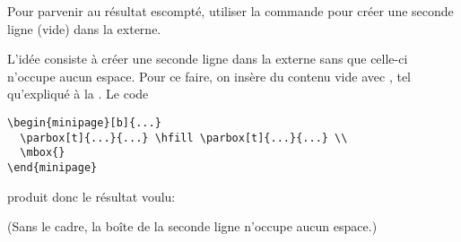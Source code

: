 \begin{exercice}
  Pour parvenir au résultat escompté, utiliser la commande \cmd{\mbox}
  pour créer une seconde ligne (vide) dans la  externe.
  \begin{sol}
    L'idée consiste à créer une seconde ligne dans la 
    externe sans que celle-ci n'occupe aucun espace. Pour ce faire, on
    insère du contenu vide avec , tel qu'expliqué à la
    . Le code
\begin{lstlisting}
\begin{minipage}[b]{...}
  \parbox[t]{...}{...} \hfill \parbox[t]{...}{...} \\
  \mbox{}
\end{minipage}
\end{lstlisting}
    produit donc le résultat voulu:
    \begin{center}
      \begin{minipage}{0.8\linewidth}
        \makebox[0pt][l]{\color{lightgray}\rule{\linewidth}{0.7pt}}\relax
        \hfill
        \hfill
      \end{minipage}
  \end{center}
  (Sans le cadre, la boîte de la seconde ligne n'occupe aucun espace.)
  \end{sol}
\end{exercice}

